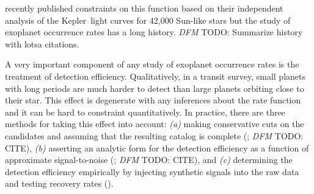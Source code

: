 \documentclass[12pt,preprint]{aastex}
\newcommand{\project}[1]{{\sffamily #1}}
\newcommand{\kepler}{\project{Kepler}}
\newcommand{\todo}[3]{{\color{#2} \emph{#1} TODO: #3}}
\newcommand{\dfmtodo}[1]{\todo{DFM}{red}{#1}}
\begin{document}
\citet{petigura} recently published constraints on this function based on
their independent analysis of the \kepler\ light curves for 42,000 Sun-like
stars but the study of exoplanet occurrence rates has a long history.
\dfmtodo{Summarize history with lotsa citations.}

A very important component of any study of exoplanet occurrence rates is the
treatment of detection efficiency.
Qualitatively, in a transit survey, small planets with long periods are much
harder to detect than large planets orbiting close to their star.
This effect is degenerate with any inferences about the rate function and it
can be hard to constraint quantitatively.
In practice, there are three methods for taking this effect into account:
\emph{(a)} making conservative cuts on the candidates and assuming that the
resulting catalog is complete (\citealt{catanzarite, traub}; \dfmtodo{CITE}),
\emph{(b)} asserting an analytic form for the detection efficiency as a
function of approximate signal-to-noise (\citealt{howard, dressing, dong,
fressin-fp, morton-swift}; \dfmtodo{CITE}), and \emph{(c)} determining the
detection efficiency empirically by injecting synthetic signals into the raw
data and testing recovery rates (\citealt{petigura-a, petigura}).
\end{document}
